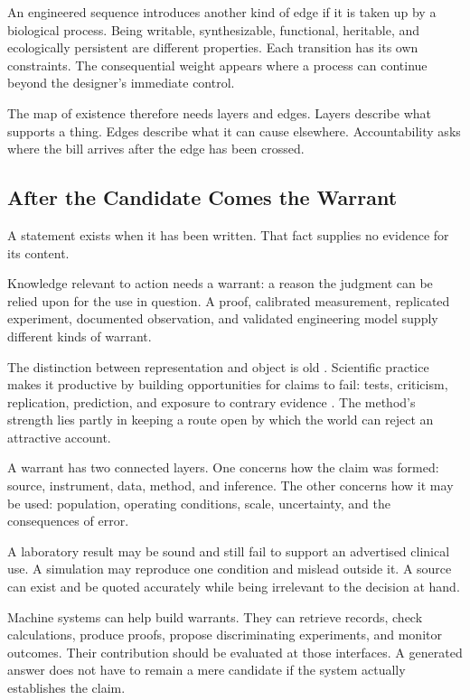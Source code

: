 An engineered sequence introduces another kind of edge if it is taken up by a biological process. Being writable, synthesizable, functional, heritable, and ecologically persistent are different properties. Each transition has its own constraints. The consequential weight appears where a process can continue beyond the designer's immediate control.

The map of existence therefore needs layers and edges. Layers describe what supports a thing. Edges describe what it can cause elsewhere. Accountability asks where the bill arrives after the edge has been crossed.

\subsection{After the Candidate Comes the Warrant}

A statement exists when it has been written. That fact supplies no evidence for its content.

Knowledge relevant to action needs a warrant: a reason the judgment can be relied upon for the use in question. A proof, calibrated measurement, replicated experiment, documented observation, and validated engineering model supply different kinds of warrant.

The distinction between representation and object is old \cite{ogden1923meaning}. Scientific practice makes it productive by building opportunities for claims to fail: tests, criticism, replication, prediction, and exposure to contrary evidence \cite{popper1934logik}. The method's strength lies partly in keeping a route open by which the world can reject an attractive account.

A warrant has two connected layers. One concerns how the claim was formed: source, instrument, data, method, and inference. The other concerns how it may be used: population, operating conditions, scale, uncertainty, and the consequences of error.

A laboratory result may be sound and still fail to support an advertised clinical use. A simulation may reproduce one condition and mislead outside it. A source can exist and be quoted accurately while being irrelevant to the decision at hand.

Machine systems can help build warrants. They can retrieve records, check calculations, produce proofs, propose discriminating experiments, and monitor outcomes. Their contribution should be evaluated at those interfaces. A generated answer does not have to remain a mere candidate if the system actually establishes the claim.

